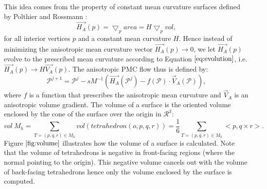\documentclass[11pt]{article}
\begin{document}
This idea comes from the property of constant mean curvature surfaces defined by Polthier and Rossmann \cite{PolthierRossmann2002}:
\begin{equation}
\vec{H_A}(p) = \bigtriangledown_p area = H \bigtriangledown_p vol,
\label{eq:evolution}
\end{equation}
for all interior vertices $p$ and a constant mean curvature $H$. Hence instead of minimizing the anisotropic mean curvature vector $\vec{H_A}(p) \rightarrow 0$, we let $\vec{H_A}(p)$ evolve to the prescribed mean curvature according to Equation $\ref{eq:evolution}$, i.e. $\vec{H_A}(p) \rightarrow H\vec{V_A}(p)$. The anisotropic PMC flow thus is defined by:
\begin{equation}
\mathcal{P}^{j+1} = \mathcal{P}^j -sM^{-1}(\vec{H_A}(\mathcal{P}^j) - f(\mathcal{P}) \cdot \vec{V}_A(\mathcal{P})),
\label{eq:pmc}
\end{equation}
where $f$ is a function that prescribes the anisotropic mean curvature and $\vec{V}_A$ is an anisotropic volume gradient. The volume of a surface is the oriented volume enclosed by the cone of the surface over the origin in $\mathcal{R}^3$:
\begin{equation}
vol \ M_h = \sum\limits_{T=(p, q, r) \in M_h}vol(tetrahedron(o, p, q, r)) = \frac{1}{6}\sum\limits_{T=(p, q, r) \in M_h}<p, q \times r>.
\label{eq:volume}
\end{equation}
Figure $\ref{fig:volume}$ illustrates how the volume of a surface is calculated. Note that the volume of tetrahedrons is negative in front-facing regions (where the normal pointing to the origin). This negative volume cancels out with the volume of back-facing tetrahedrons hence only the volume enclosed by the surface is computed.
\end{document}
